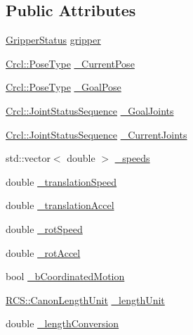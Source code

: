 \subsection*{Public Attributes}
\begin{DoxyCompactItemize}
\item 
\hyperlink{structCrcl_1_1GripperStatus}{Gripper\-Status} \hyperlink{structCrcl_1_1CrclStatus_add19fb6e10e25182b651f0dc2dbacd8a}{gripper}
\item 
\hyperlink{namespaceCrcl_acc6c82b52280f4d0e74b82a92400956e}{Crcl\-::\-Pose\-Type} \hyperlink{structCrcl_1_1CrclStatus_ac016101d8626197e7db59bd5171f4d26}{\-\_\-\-Current\-Pose}
\item 
\hyperlink{namespaceCrcl_acc6c82b52280f4d0e74b82a92400956e}{Crcl\-::\-Pose\-Type} \hyperlink{structCrcl_1_1CrclStatus_a48dc5e308a2bb1c100afefb83b6fb675}{\-\_\-\-Goal\-Pose}
\item 
\hyperlink{namespaceCrcl_a8e2d423195eeffb85b45b63f595f2825}{Crcl\-::\-Joint\-Status\-Sequence} \hyperlink{structCrcl_1_1CrclStatus_a010fa6c551d4d662488982981f20250b}{\-\_\-\-Goal\-Joints}
\item 
\hyperlink{namespaceCrcl_a8e2d423195eeffb85b45b63f595f2825}{Crcl\-::\-Joint\-Status\-Sequence} \hyperlink{structCrcl_1_1CrclStatus_a9698585e1486c01b2666490b94da8169}{\-\_\-\-Current\-Joints}
\item 
std\-::vector$<$ double $>$ \hyperlink{structCrcl_1_1CrclStatus_a5e47012aa534fb8affe8cf5c4b296825}{\-\_\-speeds}
\item 
double \hyperlink{structCrcl_1_1CrclStatus_a16ecd48f40c5a3c865a51383886acc83}{\-\_\-translation\-Speed}
\item 
double \hyperlink{structCrcl_1_1CrclStatus_a1e131c9acc8b5d1b271a9b98b6f97b8b}{\-\_\-translation\-Accel}
\item 
double \hyperlink{structCrcl_1_1CrclStatus_aff43a0827ac1ee82202fceaae9b1bdad}{\-\_\-rot\-Speed}
\item 
double \hyperlink{structCrcl_1_1CrclStatus_a4ac7019071f53426f10f7da29018c073}{\-\_\-rot\-Accel}
\item 
bool \hyperlink{structCrcl_1_1CrclStatus_aa26f6eb02fd6e67c1a3090feb7b1d6b8}{\-\_\-b\-Coordinated\-Motion}
\item 
\hyperlink{namespaceRCS_a768c9d3a7f0e5850bc61ebede4b85b23}{R\-C\-S\-::\-Canon\-Length\-Unit} \hyperlink{structCrcl_1_1CrclStatus_a3acf7158b0eac870e8ec416f240de33f}{\-\_\-length\-Unit}
\item 
double \hyperlink{structCrcl_1_1CrclStatus_a47d448ad6a6cf9b3a0df4ef4842bcc88}{\-\_\-length\-Conversion}

\end{DoxyCompactItemize}
